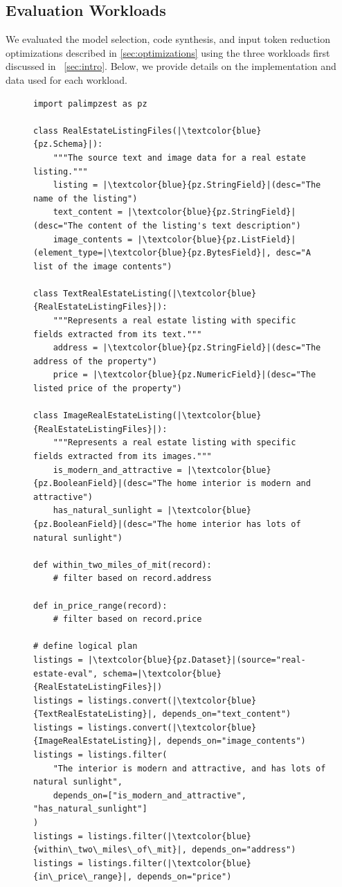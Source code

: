 \subsection{Evaluation Workloads}
We evaluated the model selection, code synthesis, and input token reduction optimizations described in \autoref{sec:optimizations} using the three workloads first discussed in ~\autoref{sec:intro}. Below, we provide details on the implementation and data used for each workload.

\begin{figure}
  \centering %
  \begin{verbatim}
import palimpzest as pz

class RealEstateListingFiles(|\textcolor{blue}{pz.Schema}|):
    """The source text and image data for a real estate listing."""
    listing = |\textcolor{blue}{pz.StringField}|(desc="The name of the listing")
    text_content = |\textcolor{blue}{pz.StringField}|(desc="The content of the listing's text description")
    image_contents = |\textcolor{blue}{pz.ListField}|(element_type=|\textcolor{blue}{pz.BytesField}|, desc="A list of the image contents")

class TextRealEstateListing(|\textcolor{blue}{RealEstateListingFiles}|):
    """Represents a real estate listing with specific fields extracted from its text."""
    address = |\textcolor{blue}{pz.StringField}|(desc="The address of the property")
    price = |\textcolor{blue}{pz.NumericField}|(desc="The listed price of the property")

class ImageRealEstateListing(|\textcolor{blue}{RealEstateListingFiles}|):
    """Represents a real estate listing with specific fields extracted from its images."""
    is_modern_and_attractive = |\textcolor{blue}{pz.BooleanField}|(desc="The home interior is modern and attractive")
    has_natural_sunlight = |\textcolor{blue}{pz.BooleanField}|(desc="The home interior has lots of natural sunlight")

def within_two_miles_of_mit(record):
    # filter based on record.address

def in_price_range(record):
    # filter based on record.price

# define logical plan
listings = |\textcolor{blue}{pz.Dataset}|(source="real-estate-eval", schema=|\textcolor{blue}{RealEstateListingFiles}|)
listings = listings.convert(|\textcolor{blue}{TextRealEstateListing}|, depends_on="text_content")
listings = listings.convert(|\textcolor{blue}{ImageRealEstateListing}|, depends_on="image_contents")
listings = listings.filter(
    "The interior is modern and attractive, and has lots of natural sunlight",
    depends_on=["is_modern_and_attractive", "has_natural_sunlight"]
)
listings = listings.filter(|\textcolor{blue}{within\_two\_miles\_of\_mit}|, depends_on="address")
listings = listings.filter(|\textcolor{blue}{in\_price\_range}|, depends_on="price")


\end{verbatim}
\end{figure}

